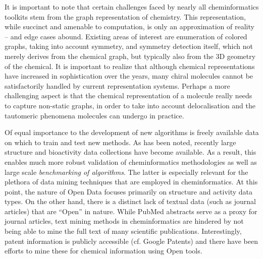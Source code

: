 \documentclass{sig-alternate}
\begin{document}
It is important to note that certain challenges faced by nearly all
cheminformatics toolkits stem from the graph representation of
chemistry. This representation, while succinct and amenable to
computation, is only an approximation of reality -- and edge cases
abound. Existing areas of interest are enumeration of colored graphs,
taking into account symmetry, and symmetry detection itself, which not
merely derives from the chemical graph, but typically also from the 3D
geometry of the chemical. It is important to realize that although
chemical representations have increased in sophistication over the
years, many chiral molecules cannot be satisfactorily handled by
current representation systems. Perhaps a more challenging aspect is
that the chemical representation of a molecule really needs to capture
non-static graphs, in order to take into account delocalisation and
the tautomeric phenomena molecules can undergo in practice.

Of equal importance to the development of new algorithms is freely
available data on which to train and test new methods. As has been
noted, recently large structure and bioactivity data collections have
become available. As a result, this enables much more robust
validation of cheminformatics methodologies as well as large scale
\emph{benchmarking of algorithms}. The latter is especially relevant
for the plethora of data mining techniques that are employed in
cheminformatics. At this point, the nature of Open Data focuses
primarily on structure and activity data types. On the other hand,
there is a distinct lack of textual data (such as journal articles)
that are ``Open'' in nature. While PubMed abstracts serve as a proxy
for journal articles, text mining methods in cheminformatics are
hindered by not being able to mine the full text of many scientific
publications.  Interestingly, patent information is publicly
accessible (cf. Google Patents) and there have been efforts to mine
these for chemical information using Open tools.

%
\end{document}
